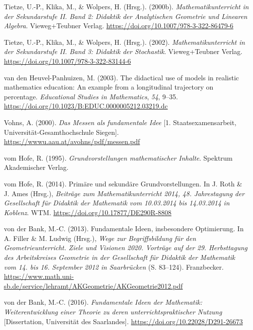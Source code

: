 \documentclass[
]{scrbook}
\newlength{\cslhangindent}
\newlength{\cslentryspacingunit} %
\newenvironment{CSLReferences}[2] %
 {%
  \setlength{\parindent}{0pt}
  \ifodd #1
  \let\oldpar\par
  \def\par{\hangindent=\cslhangindent\oldpar}
  \fi
  \setlength{\parskip}{#2\cslentryspacingunit}
 }%
 {}
\theoremstyle{definition}
\theoremstyle{definition}
\theoremstyle{definition}
\theoremstyle{definition}
\theoremstyle{remark}
\begin{document}
\begin{CSLReferences}{1}{0}
\leavevmode{}%
Tietze, U.-P., Klika, M., \& Wolpers, H. (Hrsg.). (2000b). \emph{Mathematikunterricht in der {Sekundarstufe} {II}. {Band} 2: {Didaktik} der {Analytischen} {Geometrie} und {Linearen} {Algebra}}. Vieweg+Teubner Verlag. \url{https://doi.org/10.1007/978-3-322-86479-6}

\leavevmode{}%
Tietze, U.-P., Klika, M., \& Wolpers, H. (Hrsg.). (2002). \emph{Mathematikunterricht in der {Sekundarstufe} {II}. {Band} 3: {Didaktik} der {Stochastik}}. Vieweg+Teubner Verlag. \url{https://doi.org/10.1007/978-3-322-83144-6}

\leavevmode{}%
van den Heuvel-Panhuizen, M. (2003). The didactical use of models in realistic mathematics education: {An} example from a longitudinal trajectory on percentage. \emph{Educational Studies in Mathematics}, \emph{54}, 9--35. \url{https://doi.org/10.1023/B:EDUC.0000005212.03219.dc}

\leavevmode{}%
Vohns, A. (2000). \emph{Das {Messen} als fundamentale {Idee}} {[}1. Staatsexamensarbeit, Universität-Gesamthochschule Siegen{]}. \url{https://wwwu.aau.at/avohns/pdf/messen.pdf}

\leavevmode{}%
vom Hofe, R. (1995). \emph{Grundvorstellungen mathematischer {Inhalte}}. Spektrum Akademischer Verlag.

\leavevmode{}%
vom Hofe, R. (2014). Primäre und sekundäre {Grundvorstellungen}. In J. Roth \& J. Ames (Hrsg.), \emph{Beiträge zum {Mathematikunterricht} 2014, 48. {Jahrestagung} der {Gesellschaft} für {Didaktik} der {Mathematik} vom 10.03.2014 bis 14.03.2014 in {Koblenz}}. WTM. \url{https://doi.org/10.17877/DE290R-8808}

\leavevmode{}%
von der Bank, M.-C. (2013). Fundamentale {Ideen}, insbesondere {Optimierung}. In A. Filler \& M. Ludwig (Hrsg.), \emph{Wege zur {Begriffsbildung} für den {Geometrieunterricht}. {Ziele} und {Visionen} 2020. {Vorträge} auf der 29. {Herbsttagung} des {Arbeitskreises} {Geometrie} in der {Gesellschaft} für {Didaktik} der {Mathematik} vom 14. bis 16. {September} 2012 in {Saarbrücken}} (S. 83--124). Franzbecker. \url{https://www.math.uni-sb.de/service/lehramt/AKGeometrie/AKGeometrie2012.pdf}

\leavevmode{}%
von der Bank, M.-C. (2016). \emph{Fundamentale {Ideen} der {Mathematik}: {Weiterentwicklung} einer {Theorie} zu deren unterrichtspraktischer {Nutzung}} {[}Dissertation, Universität des Saarlandes{]}. \url{https://doi.org/10.22028/D291-26673}


\end{CSLReferences}
\end{document}
